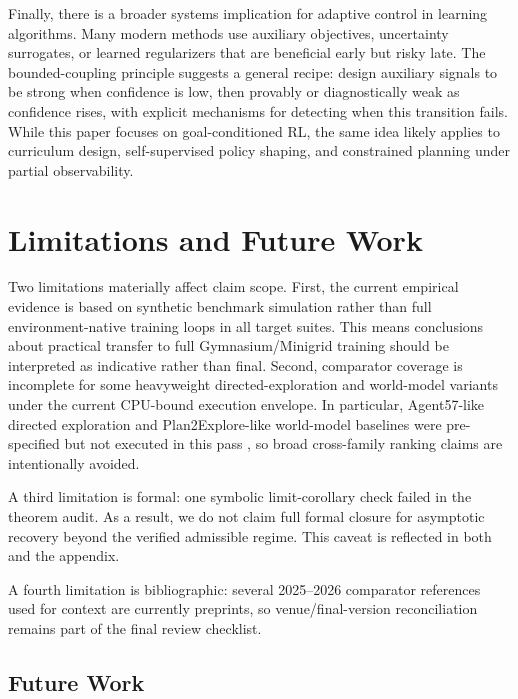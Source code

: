 \documentclass{article} %
\begin{document}
Finally, there is a broader systems implication for adaptive control in learning algorithms. Many modern methods use auxiliary objectives, uncertainty surrogates, or learned regularizers that are beneficial early but risky late. The bounded-coupling principle suggests a general recipe: design auxiliary signals to be strong when confidence is low, then provably or diagnostically weak as confidence rises, with explicit mechanisms for detecting when this transition fails. While this paper focuses on goal-conditioned RL, the same idea likely applies to curriculum design, self-supervised policy shaping, and constrained planning under partial observability.

\section{Limitations and Future Work}
\label{sec:limitations}

Two limitations materially affect claim scope. First, the current empirical evidence is based on synthetic benchmark simulation rather than full environment-native training loops in all target suites. This means conclusions about practical transfer to full Gymnasium/Minigrid training should be interpreted as indicative rather than final. Second, comparator coverage is incomplete for some heavyweight directed-exploration and world-model variants under the current CPU-bound execution envelope. In particular, Agent57-like directed exploration and Plan2Explore-like world-model baselines were pre-specified but not executed in this pass \citep{arxiv2002_06038, arxiv2005_05960}, so broad cross-family ranking claims are intentionally avoided.

A third limitation is formal: one symbolic limit-corollary check failed in the theorem audit. As a result, we do not claim full formal closure for asymptotic recovery beyond the verified admissible regime. This caveat is reflected in both  and the appendix.

A fourth limitation is bibliographic: several 2025--2026 comparator references used for context are currently preprints, so venue/final-version reconciliation remains part of the final review checklist.

\subsection{Future Work}
\end{document}
